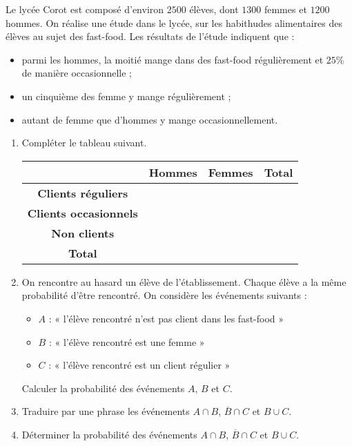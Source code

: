 \documentclass[11pt]{article}
\begin{document}
\begin{app}
  Le lycée Corot est composé d'environ $2500$ élèves, dont $1300$ femmes et
  $1200$ hommes. On réalise une étude dans le lycée, sur les habithudes
  alimentaires des élèves au sujet des fast-food. Les résultats de l'étude
  indiquent que :
  \begin{itemize}
    \item parmi les hommes, la moitié mange dans des fast-food régulièrement et
      $25$\% de manière occasionnelle ;
    \item un cinquième des femme y mange régulièrement ;
    \item autant de femme que d'hommes y mange occasionnellement.
  \end{itemize}
\begin{enumerate}
  \item Compléter le tableau suivant.\\[-13mm]
\begin{center}
\renewcommand{\arraystretch}{1.5}
\begin{tabular}{|c|c|c|c|}
  \cline{2-4}
  \multicolumn{1}{c|}{} & \textbf{Hommes} & \textbf{Femmes} &
  \textbf{\quad Total\quad} \\
  \hline
  \textbf{Clients réguliers} & & & \\
  \hline
  \textbf{Clients occasionnels} & & & \\
  \hline
  \textbf{Non clients} & & & \\
  \hline
  \textbf{Total} & & &  \\
  \hline
\end{tabular}
\end{center}
  \item On rencontre au hasard un élève de l'établissement. Chaque élève a la
    même probabilité d'être rencontré. On considère les événements suivants :
    \begin{itemize}
      \item $A$ : « l'élève rencontré n'est pas client dans les fast-food »
      \item $B$ : « l'élève rencontré est une femme »
      \item $C$ : « l'élève rencontré est un client régulier »
    \end{itemize}
    Calculer la probabilité des événements $A$, $B$ et $C$.
  \item Traduire par une phrase les événements $A\cap B$, $\overline B\cap C$
    et $B\cup C$.
  \item Déterminer la probabilité des événements $A\cap B$, $\overline B\cap C$
    et $B\cup C$.
\end{enumerate}
\end{app}
\end{document}
